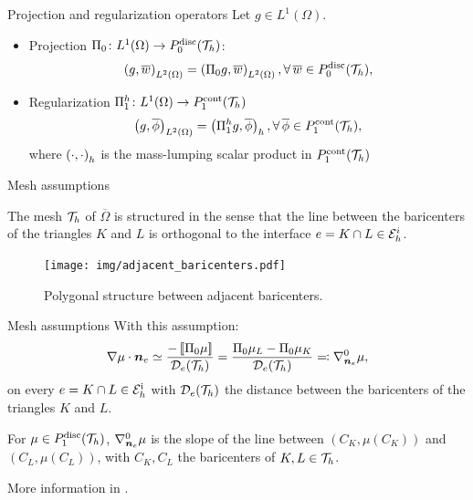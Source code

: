 \begin{frame}{Projection and regularization operators}
	Let $g\in L^1(\Omega)$.

	\begin{itemize}
		\item Projection $\Pi_0\colon L^1(\Omega) \rightarrow \relax{P}^{\text{disc}}_0(\mathcal{T}_h)$:
		\begin{equation*}
			\left(g,\overline{w}\right)_{L^2(\Omega)}=
			\left(\Pi_0 g,\overline{w}\right)_{L^2(\Omega)},\forall\,\overline{w}\in \relax{P}^{\text{disc}}_0(\mathcal{T}_h),
		\end{equation*}
		\item Regularization $\Pi^h_1\colon L^1(\Omega)\rightarrow \relax{P}^{\text{cont}}_1(\mathcal{T}_h)$
		\begin{equation*}
			\left(g,\overline{\phi}\right)_{L^2(\Omega)}=\left(\Pi^h_1 g,\overline{\phi}\right)_h,\forall\,\overline{\phi}\in \relax{P}^{\text{cont}}_1(\mathcal{T}_h),
		\end{equation*}
		where $\left(\cdot,\cdot\right)_h$ is the mass-lumping scalar product in $\relax{P}^{\text{cont}}_1(\mathcal{T}_h)$
	\end{itemize}
\end{frame}

\begin{frame}{Mesh assumptions}
	\begin{hypothesis}
		\label{hyp:mesh_n}
		The mesh $\mathcal{T}_h$ of $\overline\Omega$ is structured in the sense that the line between the baricenters of the triangles $K$ and $L$ is orthogonal to the interface $e=K\cap L\in\mathcal{E}_h^i$.
	\end{hypothesis}
	\vspace*{0.5cm}
	\begin{figure}
		\centering
		\texttt{[image: img/adjacent\_baricenters.pdf]}
		\caption{Polygonal structure between adjacent baricenters.}
	\end{figure}
\end{frame}
\begin{frame}{Mesh assumptions}
	With this assumption:
	$$\nabla\mu \cdot \boldsymbol{n}_e \simeq\frac{-\left[\!\left[\Pi_0\mu\right]\!\right]}{\mathcal{D}_e(\mathcal{T}_h)}= \frac{\Pi_0\mu_L-\Pi_0\mu_K}{\mathcal{D}_e(\mathcal{T}_h)}\eqqcolon \nabla_{\boldsymbol{n}_e}^0\mu,$$
	on every $e=K\cap L\in\mathcal{E}_h^{\text{i}}$ with $\mathcal{D}_e(\mathcal{T}_h)$ the distance between the baricenters of the triangles $K$ and $L$.

	\begin{block}{}
		For $\mu\in\relax{P}^{\text{disc}}_1(\mathcal{T}_h)$, $\nabla_{\boldsymbol{n}_e}^0\mu$ is the slope of the line between $(C_K, \mu(C_K))$ and $(C_L, \mu(C_L))$, with $C_K, C_L$ the baricenters of $K, L\in\mathcal{T}_h$.
	\end{block}

	More information in \cite{acosta-soba_KS_2022}.
\end{frame}

